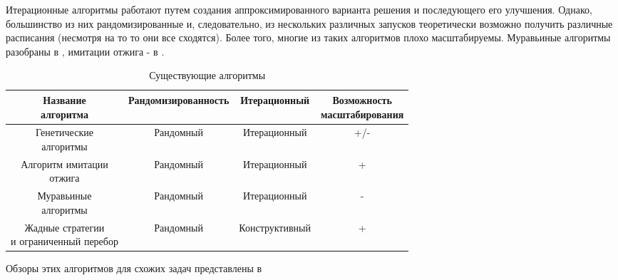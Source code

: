 Итерационные алгоритмы работают путем создания аппроксимированного варианта решения и последующего его улучшения. Однако, большинство из них рандомизированные и, следовательно, из нескольких различных запусков теоретически возможно получить различные расписания (несмотря на то то они все сходятся). Более того, многие из таких алгоритмов плохо масштабируемы. Муравьиные алгоритмы разобраны в \cite{Shtovba_2005}, имитации отжига - в \cite{Kirkpatrick_1983}.
\begin{table}[H]
    \caption{Существующие алгоритмы}
    \begin{tabular}{ c | c | c | c  }
        \makecell{Название          \\алгоритма} & Рандомизированность & Итерационный & \makecell{Возможность \\ масштабирования} \\
        \hline
        \makecell{Генетические      \\алгоритмы} & Рандомный & Итерационный & +/- \\
        \makecell{Алгоритм имитации \\отжига} & Рандомный & Итерационный & + \\
        \makecell{Муравьиные        \\алгоритмы} & Рандомный & Итерационный & - \\
        \makecell{Жадные стратегии  \\и ограниченный перебор} & Рандомный & Конструктивный & + \\
    \end{tabular}

\end{table}

Обзоры этих алгоритмов для схожих задач представлены в \cite{Coffman,Davis_2011,Shakhbazyan_1981}